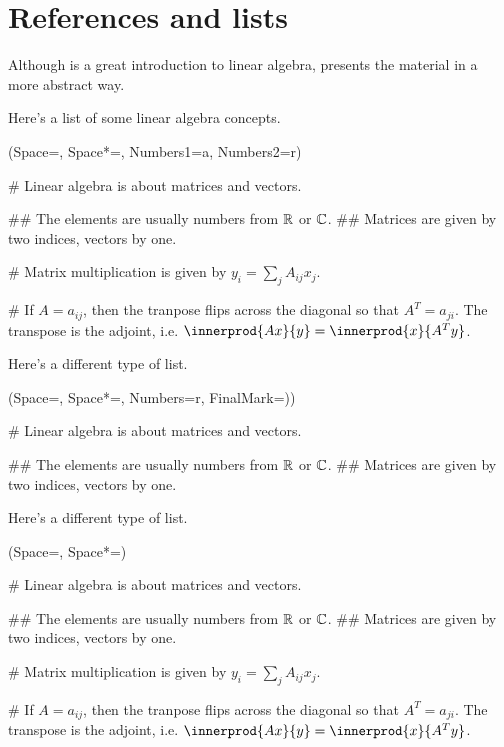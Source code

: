 \label{chapter:some_more_latex}

\section{References and lists}

Although \cite{strang_linear_1976} is a great introduction to linear algebra, \cite{roman_advanced_2005} presents the material in a more abstract way.

Here's a list of some linear algebra concepts.
\begin{easylist}[enumerate]
	\ListProperties(Space=\listSpace, Space*=\listSpace, Numbers1=a, Numbers2=r)
	
	# Linear algebra is about matrices and vectors.
	
	## The elements are usually numbers from $\operatorname{\mathbb{R}}$ or $\operatorname{\mathbb{C}}$.
	## Matrices are given by two indices, vectors by one.
	
	# Matrix multiplication is given by $y_i = \sum_j A_{ij} x_j$.
	
	# If $A = a_{ij}$, then the tranpose flips across the diagonal so that $A^T = a_{ji}$.
	The transpose is the adjoint, i.e. $\innerprod{Ax}{y} = \innerprod{x}{A^Ty}$.
\end{easylist}


Here's a different type of list.

\begin{easylist}[enumerate]
	\ListProperties(Space=\listSpace, Space*=\listSpace, Numbers=r, FinalMark={)})
	
	# Linear algebra is about matrices and vectors.
	
	## The elements are usually numbers from $\operatorname{\mathbb{R}}$ or $\operatorname{\mathbb{C}}$.
	## Matrices are given by two indices, vectors by one.

\end{easylist}

Here's a different type of list.

\begin{easylist}[itemize]
	\ListProperties(Space=\listSpace, Space*=\listSpace)
	
	# Linear algebra is about matrices and vectors.
	
	## The elements are usually numbers from $\operatorname{\mathbb{R}}$ or $\operatorname{\mathbb{C}}$.
	## Matrices are given by two indices, vectors by one.
	
	# Matrix multiplication is given by $y_i = \sum_j A_{ij} x_j$.
	
	# If $A = a_{ij}$, then the tranpose flips across the diagonal so that $A^T = a_{ji}$.
	The transpose is the adjoint, i.e. $\innerprod{Ax}{y} = \innerprod{x}{A^Ty}$.
\end{easylist}


